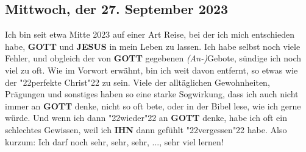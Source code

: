 \documentclass[10pt,a5paper]{article}
\newcommand{\Gott}[0]{\textbf{GOTT}}
\newcommand{\Ihn}[0]{\textbf{IHN}}
\newcommand{\Jesus}[0]{\textbf{JESUS}}
\newcommand{\q}[1]{\char"22{#1}\char"22 }
\begin{document}
	\subsection{Mittwoch, der 27. September 2023}
		Ich bin seit etwa Mitte 2023 auf einer Art Reise,
		bei der ich mich entschieden habe,
		{\Gott} und {\Jesus} in mein Leben zu lassen.
		Ich habe selbst noch viele Fehler,
		und obgleich der von {\Gott} gegebenen \textit{(An-)}Gebote,
		s\"undige ich noch viel zu oft.
		Wie im Vorwort erw\"ahnt,
		bin ich weit davon entfernt,
		so etwas wie der \q{perfekte Christ} zu sein.
		Viele der allt\"aglichen Gewohnheiten,
		Pr\"agungen und sonstiges haben so eine starke Sogwirkung,
		dass ich auch nicht immer an {\Gott} denke,
		nicht so oft bete,
		oder in der Bibel lese,
		wie ich gerne w\"urde.
		Und wenn ich dann \q{wieder} an {\Gott} denke,
		habe ich oft ein schlechtes Gewissen,
		weil ich {\Ihn} dann gef\"uhlt \q{vergessen} habe.
		Also kurzum:
		Ich darf noch sehr, sehr, sehr, ..., sehr viel lernen!
		
\end{document}
